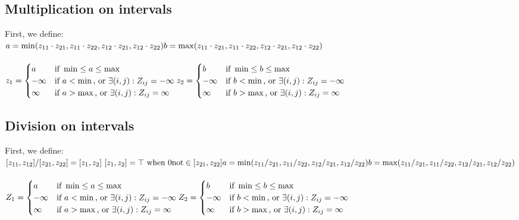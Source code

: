 \subsection{Multiplication on intervals}
First, we define:\\
$
a = \min(z_{11} \cdot z_{21}, z_{11} \cdot z_{22}, z_{12} \cdot z_{21}, z_{12} \cdot z_{22})\\
b = \max(z_{11} \cdot z_{21}, z_{11} \cdot z_{22}, z_{12} \cdot z_{21}, z_{12} \cdot z_{22})\\
$\\\\
$z_1 =
     \begin{cases} 
        a       & \text{if } \min \leq a \leq \max \\
        -\infty & \text{if } a < \min \text{, or } \exists (i,j) : {Z_{ij} = -\infty} \\
        \infty & \text{if } a > \max \text{, or } \exists (i,j) : {Z_{ij} = \infty} \\
     \end{cases}\\
z_2 =
     \begin{cases} 
        b       & \text{if } \min \leq b \leq \max \\
        -\infty & \text{if } b < \min \text{, or } \exists (i,j) : {Z_{ij} = -\infty} \\
        \infty & \text{if } b > \max \text{, or } \exists (i,j) : {Z_{ij} = \infty} \\
     \end{cases}
$
\subsection{Division on intervals}
First, we define:\\
$
[z_{11}, z_{12}] / [z_{21}, z_{22}] = [z_{1}, z_{2}]\
[z_{1}, z_{2}] = \top \text{ when } 0 \text{not} \in [z_{21}, z_{22}]\\
a = \min(z_{11} / z_{21}, z_{11} / z_{22}, z_{12} / z_{21}, z_{12} / z_{22})\\
b = \max(z_{11} / z_{21}, z_{11} / z_{22}, z_{12} / z_{21}, z_{12} / z_{22})\\
$\\\\
$Z_1 =
     \begin{cases} 
        a       & \text{if } \min \leq a \leq \max \\
        -\infty & \text{if } a < \min \text{, or } \exists (i,j) : {Z_{ij} = -\infty} \\
        \infty & \text{if } a > \max \text{, or } \exists (i,j) : {Z_{ij} = \infty} \\
     \end{cases}\\
Z_2 =
     \begin{cases} 
        b       & \text{if } \min \leq b \leq \max \\
        -\infty & \text{if } b < \min \text{, or } \exists (i,j) : {Z_{ij} = -\infty} \\
        \infty & \text{if } b > \max \text{, or } \exists (i,j) : {Z_{ij} = \infty} \\
     \end{cases}
$


